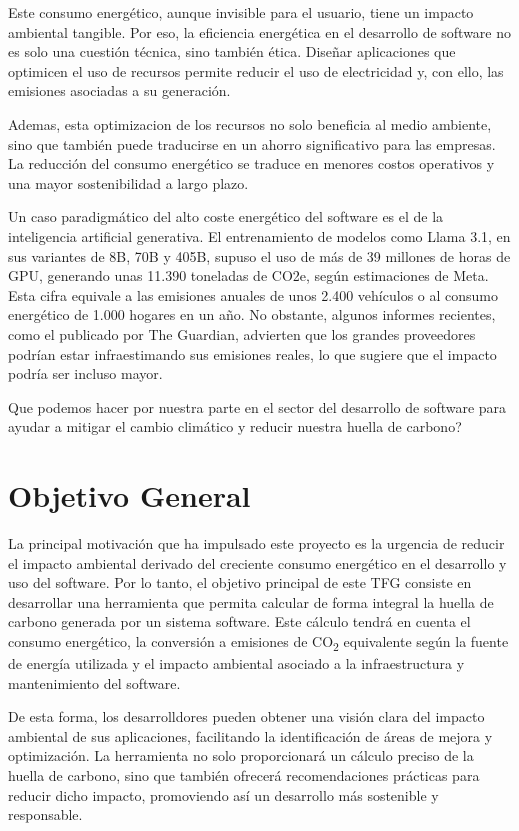 \documentclass[12pt,a4paper]{report}
\begin{document}
Este consumo energético, aunque invisible para el usuario, tiene un impacto
ambiental tangible. Por eso, la eficiencia energética en el desarrollo de
software no es solo una cuestión técnica, sino también ética. Diseñar
aplicaciones que optimicen el uso de recursos permite reducir el uso de
electricidad y, con ello, las emisiones asociadas a su generación.

Ademas, esta optimizacion de los recursos no solo beneficia al medio ambiente,
sino que también puede traducirse en un ahorro significativo para las empresas.
La reducción del consumo energético se traduce en menores costos operativos y
una mayor sostenibilidad a largo plazo.

Un caso paradigmático del alto coste energético del software es el de la
inteligencia artificial generativa. El entrenamiento de modelos como Llama 3.1,
en sus variantes de 8B, 70B y 405B, supuso el uso de más de 39 millones de
horas de GPU, generando unas 11.390 toneladas de CO2e, según estimaciones de
Meta. Esta cifra equivale a las emisiones anuales de unos 2.400 vehículos o al
consumo energético de 1.000 hogares en un año. No obstante, algunos informes
recientes, como el publicado por The Guardian, advierten que los grandes
proveedores podrían estar infraestimando sus emisiones reales, lo que sugiere
que el impacto podría ser incluso mayor.

Que podemos hacer por nuestra parte en el sector del desarrollo de software
para ayudar a mitigar el cambio climático y reducir nuestra huella de carbono?

\section{Objetivo General}

La principal motivación que ha impulsado este proyecto es la urgencia de
reducir el impacto ambiental derivado del creciente consumo energético en el
desarrollo y uso del software. Por lo tanto, el objetivo principal de este TFG
consiste en desarrollar una herramienta que permita calcular de forma integral
la huella de carbono generada por un sistema software. Este cálculo tendrá en
cuenta el consumo energético, la conversión a emisiones de CO\textsubscript{2}
equivalente según la fuente de energía utilizada y el impacto ambiental
asociado a la infraestructura y mantenimiento del software.

De esta forma, los desarrolldores pueden obtener una visión clara del impacto
ambiental de sus aplicaciones, facilitando la identificación de áreas de mejora
y optimización. La herramienta no solo proporcionará un cálculo preciso de la
huella de carbono, sino que también ofrecerá recomendaciones prácticas para
reducir dicho impacto, promoviendo así un desarrollo más sostenible y
responsable.
\end{document}
